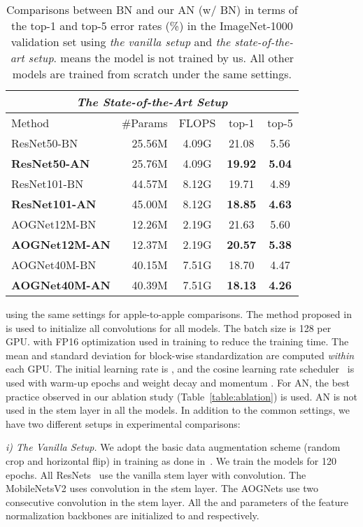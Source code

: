 \documentclass[runningheads]{llncs}
\begin{document}
\begin{wraptable}{r}{0.5\textwidth}
{{\begin{tabular}{lrccc}
    \multicolumn{5}{c}{\textit{The State-of-the-Art Setup}} \\ \hline
    Method & \#Params & FLOPS & top-1 & top-5 \\ \hline
    ResNet50-BN & 25.56M & 4.09G & 21.08 & 5.56  \\ 
    \textbf{ResNet50-AN} & 25.76M & 4.09G & \textbf{19.92} & \textbf{5.04}  \\    \bottomrule
    ResNet101-BN & 44.57M & 8.12G & 19.71 & 4.89  \\
    \textbf{ResNet101-AN} & 45.00M & 8.12G & \textbf{18.85} & \textbf{4.63}  \\\bottomrule
    AOGNet12M-BN & 12.26M & 2.19G & 21.63 & 5.60 \\
    \textbf{AOGNet12M-AN} & 12.37M & 2.19G & \textbf{20.57} & \textbf{5.38} \\ \bottomrule
    AOGNet40M-BN & 40.15M & 7.51G & 18.70 & 4.47 \\
    \textbf{AOGNet40M-AN} & 40.39M & 7.51G & \textbf{18.13} & \textbf{4.26} \\ \bottomrule
    \end{tabular}  }}
\caption{Comparisons between BN and our AN (w/ BN) in terms of the top-1 and top-5 error rates (\%) in the ImageNet-1000 validation set using \textit{the vanilla setup} and \textit{the state-of-the-art setup}. 
     means the model is not trained by us. 
    All other models are trained from scratch under the same settings. 
    }\label{table:imagenet-results} \end{wraptable}  using the same settings for apple-to-apple comparisons. The method proposed in~\cite{KaimingNormInit} is used to initialize all convolutions for all models. The batch size is 128 per GPU.
with FP16 optimization used in training to reduce the training time.
The mean and standard deviation for block-wise standardization are computed \textit{within} each GPU. The initial learning rate is , and the cosine learning rate scheduler~\cite{cosine_lr} is used with  warm-up epochs and weight decay  and momentum . For AN, the best practice observed in our ablation study (Table~\ref{table:ablation}) is used. AN is not used in the stem layer in all the models.   In addition to the common settings, we have two different setups in experimental comparisons: 


\textit{i) The Vanilla Setup.} We adopt the basic data augmentation scheme (random crop and horizontal flip) in training as done in~\cite{ResidualNet}. We train the models for 120 epochs. All ResNets~\cite{ResidualNet} use the vanilla stem layer with  convolution. The MobileNetsV2 uses  convolution in the stem layer. The AOGNets use two consecutive  convolution in the stem layer. All the  and  parameters of the feature normalization backbones are initialized to  and  respectively.    
\end{document}
